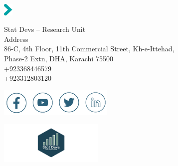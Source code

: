 
\thispagestyle{empty}


\begin{center}

\color{statdevs}

\vspace*{10cm}

\includegraphics[height=0.6cm]{quarto-statdevs-template/images/fleche-titre.png}\par

\sffamily
Stat Devs -- Research Unit\\
Address\\
86-C, 4th Floor, 11th Commercial Street, Kh-e-Ittehad, \\
Phase-2 Extn, DHA, Karachi 75500 \\
+923368446579\\
+923312803120\par\bigskip

\includegraphics{quarto-statdevs-template/images/social-media.png}\par\bigskip

\vspace*{2cm}

\par\bigskip

\includegraphics[width=5cm]{quarto-statdevs-template/images/Final-Logo.png}\par

\end{center}

\restoregeometry
